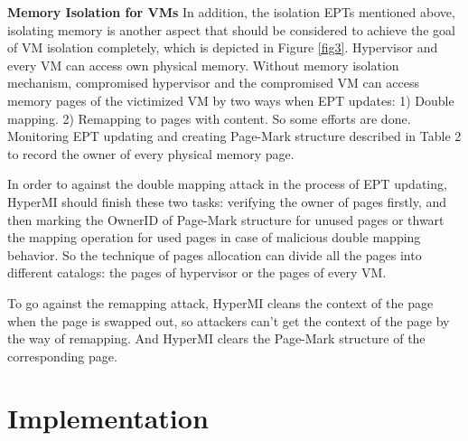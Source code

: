 \documentclass[conference]{IEEEtran}
\begin{document}
\textbf{Memory Isolation for VMs }
In addition, the isolation EPTs mentioned above, isolating memory is another aspect that should be considered to achieve the goal of VM isolation completely, which is depicted in Figure \ref{fig3}. 
Hypervisor and every VM can access own physical memory. Without memory isolation mechanism, compromised hypervisor and the compromised VM can access memory pages of the victimized VM by two ways when EPT updates: 1) Double mapping. 2) Remapping to pages with content. So some efforts are done. Monitoring EPT updating and creating Page-Mark structure described in Table 2 to record the owner of every physical memory page. 



In order to against the double mapping attack in the process of EPT updating, HyperMI should finish these two tasks: verifying the owner of pages firstly, and then marking the OwnerID of Page-Mark structure for unused pages or thwart the mapping operation for used pages in case of malicious double mapping behavior. So the technique of pages allocation can divide all the pages into different catalogs: the pages of hypervisor or the pages of every VM.

To go against the remapping attack, HyperMI cleans the context of the page when the page is swapped out, so attackers can't get the context of the page by the way of remapping. And HyperMI clears the Page-Mark structure of the corresponding page. 

\iffalse
\section{Implementation}\label{sec:imp}
\end{document}
